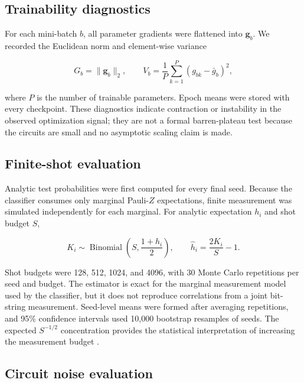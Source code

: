 \documentclass[pdflatex,sn-mathphys-num]{sn-jnl}
\begin{document}
\subsection{Trainability diagnostics}

For each mini-batch $b$, all parameter gradients were flattened into $\boldsymbol{g}_b$. We recorded the Euclidean norm and element-wise variance

\begin{equation}
G_b=\lVert\boldsymbol{g}_b\rVert_2,
\qquad
V_b=\frac{1}{P}\sum_{k=1}^{P}(g_{bk}-\bar g_b)^2,
\label{eq:gradient}
\end{equation}

where $P$ is the number of trainable parameters. Epoch means were stored with every checkpoint. These diagnostics indicate contraction or instability in the observed optimization signal; they are not a formal barren-plateau test because the circuits are small and no asymptotic scaling claim is made.

\subsection{Finite-shot evaluation}

Analytic test probabilities were first computed for every final seed. Because the classifier consumes only marginal Pauli-$Z$ expectations, finite measurement was simulated independently for each marginal. For analytic expectation $h_i$ and shot budget $S$,

\begin{equation}
K_i\sim\operatorname{Binomial}\!\left(S,\frac{1+h_i}{2}\right),
\qquad
\widehat h_i=\frac{2K_i}{S}-1.
\label{eq:shots}
\end{equation}

Shot budgets were 128, 512, 1024, and 4096, with 30 Monte Carlo repetitions per seed and budget. The estimator is exact for the marginal measurement model used by the classifier, but it does not reproduce correlations from a joint bit-string measurement. Seed-level means were formed after averaging repetitions, and 95\% confidence intervals used 10,000 bootstrap resamples of seeds. The expected $S^{-1/2}$ concentration provides the statistical interpretation of increasing the measurement budget \cite{CATAK-2026}.

\subsection{Circuit noise evaluation}
\end{document}
